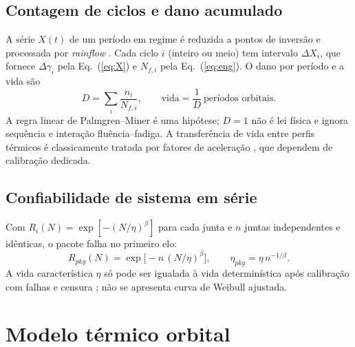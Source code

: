 \documentclass[12pt,a4paper]{article}
\begin{document}
\subsection{Contagem de ciclos e dano acumulado}
A série $X(t)$ de um período em regime é reduzida a pontos de inversão e
processada por \emph{rainflow} \cite{astm1049}. Cada ciclo $i$ (inteiro ou meio)
tem intervalo $\Delta X_i$, que fornece $\Delta\gamma_i$ pela Eq.~(\ref{eq:X}) e
$N_{f,i}$ pela Eq.~(\ref{eq:eng}). O dano por período e a vida são
\begin{equation}
D=\sum_i\frac{n_i}{N_{f,i}},\qquad \text{vida}=\frac1D\ \text{períodos orbitais}.
\label{eq:miner}
\end{equation}
A regra linear de Palmgren--Miner \cite{miner1945} é uma hipótese; $D=1$ não é
lei física e ignora sequência e interação fluência--fadiga. A transferência de
vida entre perfis térmicos é classicamente tratada por fatores de aceleração
\cite{norris1969}, que dependem de calibração dedicada.

\subsection{Confiabilidade de sistema em série}
Com $R_i(N)=\exp[-(N/\eta)^\beta]$ para cada junta e $n$ juntas independentes e
idênticas, o pacote falha no primeiro elo:
\begin{equation}
R_{pkg}(N)=\exp\!\big[-n\,(N/\eta)^\beta\big],\qquad \eta_{pkg}=\eta\,n^{-1/\beta}.
\end{equation}
A vida característica $\eta$ só pode ser igualada à vida determinística após
calibração com falhas e censura \cite{weibull1951,meeker1998}; não se apresenta
curva de Weibull ajustada.

\section{Modelo térmico orbital}
\end{document}
